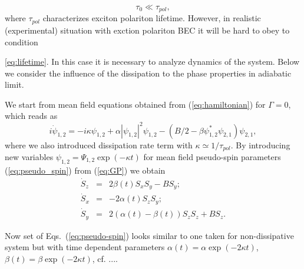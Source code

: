 \documentclass[aps, pre, preprint, groupedaddress, superscriptaddress, showkeys, showpacs] {revtex4-1}
\begin{document}
\begin{equation}
 \tau_{0}\ll\tau_{pol},
 \label{eq:lifetime}  
\end{equation}
where $\tau_{pol}$ characterizes  exciton polariton lifetime. However, in realistic (experimental) situation with exction polariton BEC it will be hard to obey to condition {\eqref{eq:lifetime}. In this case it is necessary to analyze dynamics of the system.      
 Below we consider the influence of the dissipation to the phase properties in adiabatic limit.

We start from mean field  equations obtained from  (\ref{eq:hamiltonian}) for  $\Gamma = 0$,  which reads as 
%
\begin{equation}
i \dot{\psi}_{1,2} = -i \kappa \psi_{1,2} +  \alpha |\psi_{1,2}|^2 \psi_{1,2} - (B/2 - \beta \psi_{1,2}^* \psi_{2,1}) \psi_{2,1}, 
\label{eq:GP}
\end{equation}
%
where we also introduced dissipation rate term with $\kappa \simeq 1/\tau_{pol}$.
By introducing new variables  $\psi_{1,2} = \Psi_{1,2} \exp(-\kappa t)$ for mean field pseudo-spin  parameters (\ref{eq:pseudo_spin}) from ({\ref{eq:GP}}) we obtain
%
%
%
%
% 
\begin{equation}
\begin{array}{lcl}
\dot{S}_z & = &  2 \beta(t) S_x S_y - B S_y; \\
\dot{S}_x & = & -2 \alpha(t) S_z S_y; \\
\dot{S}_y & = & 2(\alpha(t) - \beta(t)) S_z S_z + B S_z.
\end{array}
\label{eq:pseudo-spin}
\end{equation}
%

Now set of Eqs.\ ({\ref{eq:pseudo-spin}}) looks similar to one taken for  non-dissipative system but with time dependent parameters $\alpha(t) = \alpha \exp(-2 \kappa t)$, $\beta(t) = \beta \exp(-2 \kappa t)$, cf. .... 

}
\end{document}
